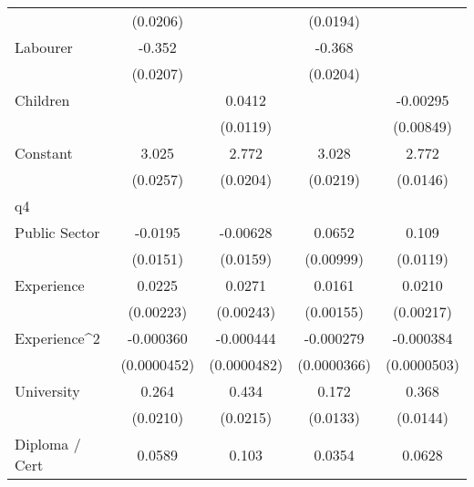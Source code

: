 {\begin{tabular}{l*{4}{c}}
                    &    (0.0206)         &                     &    (0.0194)         &                     \\
[1em]
Labourer            &      -0.352\sym{***}&                     &      -0.368\sym{***}&                     \\
                    &    (0.0207)         &                     &    (0.0204)         &                     \\
[1em]
Children            &                     &      0.0412\sym{***}&                     &    -0.00295         \\
                    &                     &    (0.0119)         &                     &   (0.00849)         \\
[1em]
Constant            &       3.025\sym{***}&       2.772\sym{***}&       3.028\sym{***}&       2.772\sym{***}\\
                    &    (0.0257)         &    (0.0204)         &    (0.0219)         &    (0.0146)         \\
\hline
q4                  &                     &                     &                     &                     \\
Public Sector       &     -0.0195         &    -0.00628         &      0.0652\sym{***}&       0.109\sym{***}\\
                    &    (0.0151)         &    (0.0159)         &   (0.00999)         &    (0.0119)         \\
[1em]
Experience          &      0.0225\sym{***}&      0.0271\sym{***}&      0.0161\sym{***}&      0.0210\sym{***}\\
                    &   (0.00223)         &   (0.00243)         &   (0.00155)         &   (0.00217)         \\
[1em]
Experience^{2}      &   -0.000360\sym{***}&   -0.000444\sym{***}&   -0.000279\sym{***}&   -0.000384\sym{***}\\
                    & (0.0000452)         & (0.0000482)         & (0.0000366)         & (0.0000503)         \\
[1em]
University          &       0.264\sym{***}&       0.434\sym{***}&       0.172\sym{***}&       0.368\sym{***}\\
                    &    (0.0210)         &    (0.0215)         &    (0.0133)         &    (0.0144)         \\
[1em]
Diploma / Cert      &      0.0589\sym{***}&       0.103\sym{***}&      0.0354\sym{**} &      0.0628\sym{***}\\

\end{tabular}}
